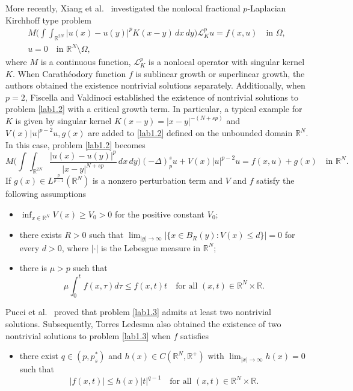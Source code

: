 \documentclass[reqno]{amsart}
\begin{document}
More recently, Xiang et al.\  \cite{r31} investigated the  nonlocal fractional 
$p$-Laplacian Kirchhoff type problem
\begin{equation}\label{lab1.2}
\begin{gathered}
M\Big(\int\int_{\mathbb{R}^{2N}}|u(x)-u(y)|^p K(x-y)\,dx\,dy\Big)
\mathcal{L}_K^pu=f(x,u)\quad \text{in }\Omega, \\
u=0\quad \text{in }\mathbb{R}^N\setminus\Omega,
\end{gathered}
\end{equation}
where $M$ is a continuous function, $\mathcal{L}_K^p$ is a nonlocal operator with 
singular kernel $K$. When Carath\'{e}odory function $f$ is sublinear growth 
or superlinear growth, the authors obtained the existence nontrivial solutions 
separately. Additionally, when $p=2$, Fiscella and Valdinoci  \cite{r8} established 
the existence of nontrivial solutions to problem \eqref{lab1.2} with a critical 
growth term. In particular, a typical example for $K$ is given by singular kernel 
$K(x-y)=|x-y|^{-(N+sp)}$ and $V(x)|u|^{p-2}u, g(x)$ are added to \eqref{lab1.2} 
defined on the unbounded domain $\mathbb{R}^N$. In this case, problem \eqref{lab1.2} 
becomes
\begin{equation}\label{lab1.3}
M\Big(\int\int_{\mathbb{R}^{2N}}\frac{|u(x)-u(y)|^p}{|x-y|^{N+sp}}\,dx\,dy\Big)
(-\Delta)_p^s u+V(x)|u|^{p-2}u=f(x,u)+g(x)\quad \text{in }\mathbb{R}^N.
\end{equation}
If $g(x)\in L^{\frac{p}{p-1}}(\mathbb{R}^N)$ is a nonzero perturbation term and 
$V$ and $f$ satisfy the following assumptions
\begin{itemize}
\item[(1)] $\inf_{x\in\mathbb{R}^N}V(x)\geq V_0>0$ for the positive constant $V_0$;

\item[(2)] there exists $R>0$ such that $\lim_{|y|\to \infty}|
\{x\in B_{R}(y): V(x)\leq d \} |=0$ for every $d>0$,
where $|\cdot|$ is the Lebesgue measure in $\mathbb{R}^N$;

\item[(3)] there is $\mu>p$ such that
\[
 \mu \int_0^tf(x,\tau)d\tau\leq f(x,t)t \quad \text{for all }  
 (x, t)\in \mathbb{R}^N\times\mathbb{R}.
\]
\end{itemize}
Pucci et al.\  \cite{r19} proved that problem \eqref{lab1.3} admits at least two 
nontrivial solutions. Subsequently, Torres Ledesma  \cite{r26} also obtained the 
existence of two nontrivial solutions to problem \eqref{lab1.3} when $f$ satisfies
\begin{itemize}
\item[(4)] there exist $q\in(p, p^*_s)$ and $h(x)\in C(\mathbb{R}^N, \mathbb{R}^+)$ 
with $\lim_{|x|\to \infty}h(x)=0$ such that
\[
 |f(x,t)|\leq h(x)|t|^{q-1} \quad \text{for all } 
  (x, t)\in \mathbb{R}^N\times\mathbb{R}.
\]
\end{itemize}
\end{document}
